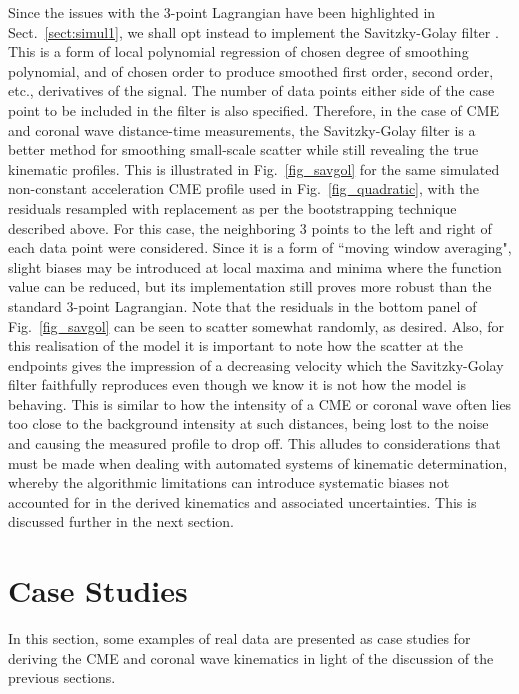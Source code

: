 \documentclass[structabstract]{aa}
\begin{document}
Since the issues with the 3-point Lagrangian have been highlighted in Sect.~\ref{sect:simul1}, we shall opt instead to implement the Savitzky-Golay filter \citep{Savitzky-Golay1964}. This is a form of local polynomial regression of chosen degree of smoothing polynomial, and of chosen order to produce smoothed first order, second order, etc., derivatives of the signal. The number of data points either side of the case point to be included in the filter is also specified. Therefore, in the case of CME and coronal wave distance-time measurements, the Savitzky-Golay filter is a better method for smoothing small-scale scatter while still revealing the true kinematic profiles. This is illustrated in Fig.~\ref{fig_savgol} for the same simulated non-constant acceleration CME profile used in Fig.~\ref{fig_quadratic}, with the residuals resampled with replacement as per the bootstrapping technique described above. For this case, the neighboring 3 points to the left and right of each data point were considered. Since it is a form of ``moving window averaging", slight biases may be introduced at local maxima and minima where the function value can be reduced, but its implementation still proves more robust than the standard 3-point Lagrangian. Note that the residuals in the bottom panel of Fig.~\ref{fig_savgol} can be seen to scatter somewhat randomly, as desired. Also, for this realisation of the model it is important to note how the scatter at the endpoints gives the impression of a decreasing velocity which the Savitzky-Golay filter faithfully reproduces even though we know it is not how the model is behaving. This is similar to how the intensity of a CME or coronal wave often lies too close to the background intensity at such distances, being lost to the noise and causing the measured profile to drop off. This alludes to considerations that must be made when dealing with automated systems of kinematic determination, whereby the algorithmic limitations can introduce systematic biases not accounted for in the derived kinematics and associated uncertainties. This is discussed further in the next section.



\section{Case Studies}
\label{sect:case_studies}

In this section, some examples of real data are presented as case studies for deriving the CME and coronal wave kinematics in light of the discussion of the previous sections. 
\end{document}
